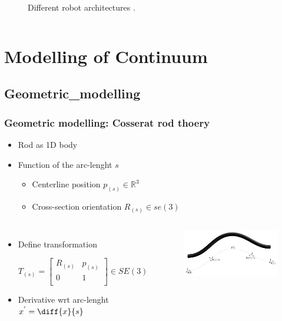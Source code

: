 \documentclass[compress]{thesisbeamer}
\begin{document}
\begin{frame}
\begin{columns}
\begin{figure}[h]
				\caption{Different robot architectures \cite{bryson_toward_2014}.}
			\end{figure}
			\end{columns}
		\end{frame}

  	\section{Modelling of Continuum}
       	\subsection{Geometric_modelling}
        \begin{frame}
        	\frametitle{Geometric modelling: Cosserat rod thoery}
			\begin{itemize}%
  				\item Rod as 1D body 
  				\item Function of the arc-lenght $ s $
  				\begin{itemize}%
   					\item Centerline position $ p_{(s)}\in\mathbb{R}^3$
   					\item Cross-section orientation $R_{(s)}\in\textit{se}(3)$
  				\end{itemize}
  			\end{itemize}
  			\begin{columns}
			\begin{itemize}%
  				\item Define transformation
  				\begin{fleqn}
  				\begin{equation}
  					T_{(s)} = 
  					\begin{bmatrix}
  						R_{(s)} & p_{(s)} 	\\
  							0	&	1		\\
  					\end{bmatrix}\in SE(3)
  				\end{equation}
  				\end{fleqn}
  				\item Derivative wrt arc-lenght $ x^{'} = \diff{x}{s} $
 			\end{itemize}
			\vspace{2cm}
			\begin{figure}[h]
				\centering
				\includegraphics[width=\textwidth]{images/rod_geometry}

\end{figure}
\end{columns}
\end{frame}
\end{document}
